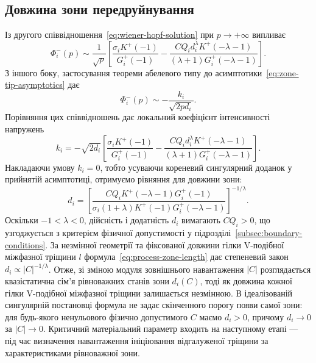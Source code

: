 \subsection{Довжина зони передруйнування}
\label{subsec:zone-length}

Із другого співвідношення~\eqref{eq:wiener-hopf-solution} при
$p\to+\infty$ випливає
\begin{equation*}
  \Phi_i^-(p)\sim\frac{1}{\sqrt{p}}
  \left[
    \frac{\sigma_iK^+(-1)}{G_i^+(-1)}
    -\frac{CQ_i d_i^\lambda K^+(-\lambda-1)}
    {(\lambda+1)G_i^+(-\lambda-1)}
  \right].
\end{equation*}
З іншого боку, застосування теореми абелевого типу
\cite{noble1958wienerhopf} до
асимптотики~\eqref{eq:zone-tip-asymptotics} дає
\begin{equation*}
  \Phi_i^-(p)\sim-\frac{k_i}{\sqrt{2pd_i}}.
\end{equation*}
Порівняння цих співвідношень дає локальний коефіцієнт інтенсивності
напружень
\begin{equation*}
  k_i=-\sqrt{2d_i}
  \left[
    \frac{\sigma_iK^+(-1)}{G_i^+(-1)}
    -\frac{CQ_i d_i^\lambda K^+(-\lambda-1)}
    {(\lambda+1)G_i^+(-\lambda-1)}
  \right].
\end{equation*}
Накладаючи умову $k_i=0$, тобто усуваючи кореневий сингулярний доданок у прийнятій асимптотиці, отримуємо рівняння для довжини зони:
\begin{equation}
\label{eq:process-zone-length}
  d_i=
  \left[
    \frac{CQ_iK^+(-\lambda-1)G_i^+(-1)}
    {\sigma_i(1+\lambda)K^+(-1)G_i^+(-\lambda-1)}
  \right]^{-1/\lambda}.
\end{equation}
Оскільки $-1<\lambda<0$, дійсність і додатність $d_i$ вимагають
$CQ_i>0$, що узгоджується з критерієм фізичної допустимості у
підрозділі~\ref{subsec:boundary-conditions}. За незмінної геометрії та
фіксованої довжини гілки V-подібної міжфазної тріщини $l$
формула~\eqref{eq:process-zone-length} дає степеневий закон
$d_i\propto |C|^{-1/\lambda}$. Отже, зі зміною модуля зовнішнього
навантаження $|C|$ розглядається квазістатична сім'я рівноважних станів
зони $d_i(C)$, тоді як довжина кожної гілки V-подібної міжфазної
тріщини залишається незмінною. В ідеалізованій сингулярній постановці
формула не задає скінченного порогу появи самої зони: для будь-якого
ненульового фізично допустимого $C$ маємо $d_i>0$, причому $d_i\to0$
за $|C|\to0$. Критичний матеріальний параметр входить на наступному
етапі --- під час визначення навантаження ініціювання відгалуженої
тріщини за характеристиками рівноважної зони.


